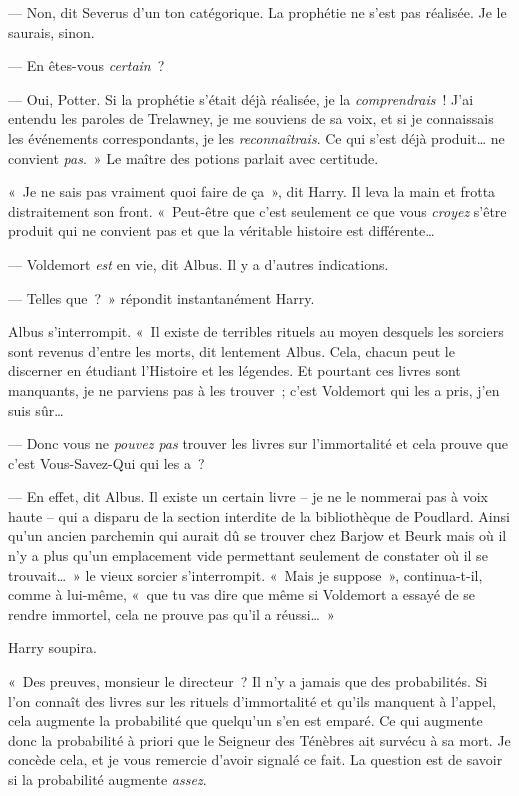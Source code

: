 --- Non, dit Severus d'un ton catégorique.
La prophétie ne s'est pas réalisée.
Je le saurais, sinon.

--- En êtes-vous \emph{certain}~?

--- Oui, Potter.
Si la prophétie s'était déjà réalisée, je la \emph{comprendrais}~!
J'ai entendu les paroles de Trelawney, je me souviens de sa voix, et si je connaissais les événements correspondants, je les \emph{reconnaîtrais}.
Ce qui s'est déjà produit… ne convient \emph{pas}.~»
Le maître des potions parlait avec certitude.

«~Je ne sais pas vraiment quoi faire de ça~», dit Harry.
Il leva la main et frotta distraitement son front.
«~Peut-être que c'est seulement ce que vous \emph{croyez} s'être produit qui ne convient pas et que la véritable histoire est différente…

--- Voldemort \emph{est} en vie, dit Albus.
Il y a d'autres indications.

--- Telles que~?~»
répondit instantanément Harry.

Albus s'interrompit.
«~Il existe de terribles rituels au moyen desquels les sorciers sont revenus d'entre les morts, dit lentement Albus.
Cela, chacun peut le discerner en étudiant l'Histoire et les légendes.
Et pourtant ces livres sont manquants, je ne parviens pas à les trouver~; c'est Voldemort qui les a pris, j'en suis sûr…

--- Donc vous ne \emph{pouvez pas} trouver les livres sur l'immortalité et cela prouve que c'est Vous-Savez-Qui qui les a~?

--- En effet, dit Albus.
Il existe un certain livre -- je ne le nommerai pas à voix haute -- qui a disparu de la section interdite de la bibliothèque de Poudlard.
Ainsi qu'un ancien parchemin qui aurait dû se trouver chez Barjow et Beurk mais où il n'y a plus qu'un emplacement vide permettant seulement de constater où il se trouvait…~»
le vieux sorcier s'interrompit.
«~Mais je suppose~», continua-t-il, comme à lui-même, «~que tu vas dire que même si Voldemort a essayé de se rendre immortel, cela ne prouve pas qu'il a réussi…~»

Harry soupira.

«~Des preuves, monsieur le directeur~?
Il n'y a jamais que des probabilités.
Si l'on connaît des livres sur les rituels d'immortalité et qu'ils manquent à l'appel, cela augmente la probabilité que quelqu'un s'en est emparé.
Ce qui augmente donc la probabilité à priori que le Seigneur des Ténèbres ait survécu à sa mort.
Je concède cela, et je vous remercie d'avoir signalé ce fait.
La question est de savoir si la probabilité augmente \emph{assez}.

